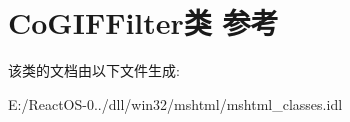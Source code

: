 \hypertarget{class_co_g_i_f_filter}{}\section{Co\+G\+I\+F\+Filter类 参考}
\label{class_co_g_i_f_filter}


该类的文档由以下文件生成\+:\begin{DoxyCompactItemize}
\item 
E\+:/\+React\+O\+S-\/0../dll/win32/mshtml/mshtml\+\_\+classes.\+idl\end{DoxyCompactItemize}
